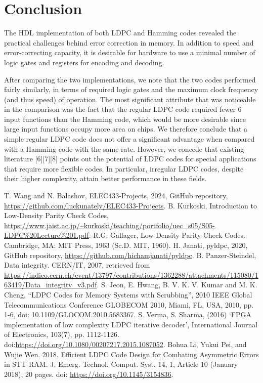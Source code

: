 \documentclass[conference]{IEEEtran}
\begin{document}
\section{Conclusion}
The HDL implementation of both LDPC and Hamming codes revealed the practical challenges behind error correction in memory.
In addition to speed and error-correcting capacity, it is desirable for hardware to use a minimal number of logic gates and registers for encoding and decoding.

After comparing the two implementations, we note that the two codes performed fairly similarly, in terms of required logic gates and the maximum clock frequency (and thus speed) of operation.
The most significant attribute that was noticeable in the comparison was the fact that the regular LDPC code required fewer 6 input functions than the Hamming code, which would be more desirable since large input functions occupy more area on chips.
We therefore conclude that a simple regular LDPC code does not offer a significant advantage when compared with a Hamming code with the same rate.
However, we concede that existing literature [6][7][8] points out the potential of LDPC codes for special applications that require more flexible codes.
In particular, irregular LDPC codes, despite their higher complexity, attain better performance in these fields.

\begin{thebibliography}{00}
   T. Wang and N. Balashov, ELEC433-Projects, 2024, GitHub repository, \url{https://github.com/luckunately/ELEC433-Projects}.
   B. Kurkoski, Introduction to Low-Density Parity Check Codes, \url{https://www.jaist.ac.jp/~kurkoski/teaching/portfolio/uec_s05/S05-LDPC%20Lecture%201.pdf}.
   R.G. Gallager, Low-Density Parity-Check Codes. Cambridge, MA: MIT Press, 1963 (Sc.D. MIT, 1960).
   H. Janati, pyldpc, 2020, GitHub repository, \url{https://github.com/hichamjanati/pyldpc}.
   B. Panzer-Steindel, Data integrity. CERN/IT, 2007, retrieved from \url{https://indico.cern.ch/event/13797/contributions/1362288/attachments/115080/163419/Data_integrity_v3.pdf}.
  S. Jeon, E. Hwang, B. V. K. V. Kumar and M. K. Cheng, ``LDPC Codes for Memory Systems with Scrubbing'', 2010 IEEE Global Telecommunications Conference GLOBECOM 2010, Miami, FL, USA, 2010, pp. 1-6, doi: 10.1109/GLOCOM.2010.5683367.
   S. Verma, S. Sharma, (2016) `FPGA implementation of low complexity LDPC iterative decoder', International Journal of Electronics, 103(7), pp. 1112-1126. doi:\url{https://doi.org/10.1080/00207217.2015.1087052}.
   Bohua Li, Yukui Pei, and Wujie Wen. 2018. Efficient LDPC Code Design for Combating Asymmetric Errors in STT-RAM. J. Emerg. Technol. Comput. Syst. 14, 1, Article 10 (January 2018), 20 pages. doi: \url{https://doi.org/10.1145/3154836}.
\end{thebibliography}
\end{document}
